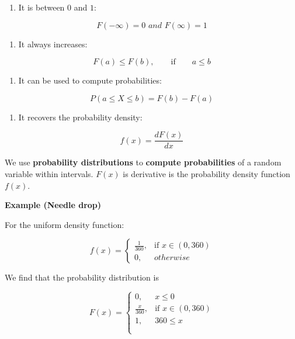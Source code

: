 \documentclass[
]{book}
\providecommand{\tightlist}{%
  \setlength{\itemsep}{0pt}\setlength{\parskip}{0pt}}
\begin{document}
\begin{enumerate}
\def\labelenumi{\arabic{enumi})}
\tightlist
\item
  It is between \(0\) and \(1\):
\end{enumerate}

\[F(-\infty)= 0 \,\, and \,\,F(\infty)=1\]

\begin{enumerate}
\def\labelenumi{\arabic{enumi})}
\setcounter{enumi}{1}
\tightlist
\item
  It always increases:
\end{enumerate}

\[F(a)\leq F(b), \qquad \text{if} \qquad a\leq b\]

\begin{enumerate}
\def\labelenumi{\arabic{enumi})}
\setcounter{enumi}{2}
\tightlist
\item
  It can be used to compute probabilities:
\end{enumerate}

\[P(a \leq X \leq b)=F(b)-F(a)\]

\begin{enumerate}
\def\labelenumi{\arabic{enumi})}
\setcounter{enumi}{3}
\tightlist
\item
  It recovers the probability density:
\end{enumerate}

\[f(x)=\frac{dF(x)}{dx}\]

We use \textbf{probability distributions} to \textbf{compute probabilities} of a random variable within intervals. \(F(x)\) is derivative is the probability density function \(f(x)\).

\textbf{Example (Needle drop)}

For the uniform density function:

\[
    f(x)= 
\begin{cases}
    \frac{1}{360},& \text{if } x\in (0,360)\\
    0,& otherwise 
\end{cases}
\]

We find that the probability distribution is

\[
    F(x)= 
\begin{cases}
    0,& x \leq 0 \\
    \frac{x}{360},& \text{if } x\in (0,360)\\
    1, & 360 \leq x \\
    \\
\end{cases}
\]
\end{document}
